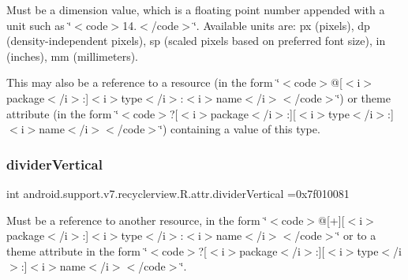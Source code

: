 Must be a dimension value, which is a floating point number appended with a unit such as \char`\"{}$<$code$>$14.\+5sp$<$/code$>$\char`\"{}. Available units are\+: px (pixels), dp (density-\/independent pixels), sp (scaled pixels based on preferred font size), in (inches), mm (millimeters). 

This may also be a reference to a resource (in the form \char`\"{}$<$code$>$@\mbox{[}$<$i$>$package$<$/i$>$\+:\mbox{]}$<$i$>$type$<$/i$>$\+:$<$i$>$name$<$/i$>$$<$/code$>$\char`\"{}) or theme attribute (in the form \char`\"{}$<$code$>$?\mbox{[}$<$i$>$package$<$/i$>$\+:\mbox{]}\mbox{[}$<$i$>$type$<$/i$>$\+:\mbox{]}$<$i$>$name$<$/i$>$$<$/code$>$\char`\"{}) containing a value of this type. \mbox{\label{classandroid_1_1support_1_1v7_1_1recyclerview_1_1R_1_1attr_ab6db74b41e87a1c9d5b221b5cef76a9e}} 
\subsubsection{\texorpdfstring{divider\+Vertical}{dividerVertical}}
{\footnotesize\ttfamily int android.\+support.\+v7.\+recyclerview.\+R.\+attr.\+divider\+Vertical =0x7f010081\hspace{0.3cm}{\ttfamily [static]}}

Must be a reference to another resource, in the form \char`\"{}$<$code$>$@\mbox{[}+\mbox{]}\mbox{[}$<$i$>$package$<$/i$>$\+:\mbox{]}$<$i$>$type$<$/i$>$\+:$<$i$>$name$<$/i$>$$<$/code$>$\char`\"{} or to a theme attribute in the form \char`\"{}$<$code$>$?\mbox{[}$<$i$>$package$<$/i$>$\+:\mbox{]}\mbox{[}$<$i$>$type$<$/i$>$\+:\mbox{]}$<$i$>$name$<$/i$>$$<$/code$>$\char`\"{}. \mbox{\label{classandroid_1_1support_1_1v7_1_1recyclerview_1_1R_1_1attr_a74665f29b592725e1f5ab0f5b9fd64fb}} 
